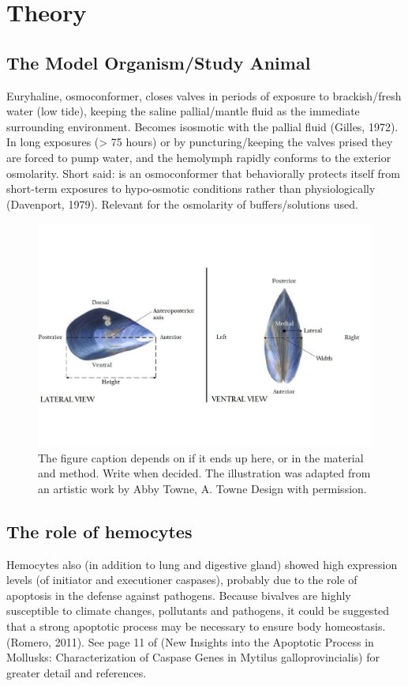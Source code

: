 \chapter{Theory}
\section{The Model Organism/Study Animal}
Euryhaline, osmoconformer, closes valves in periods of exposure to brackish/fresh water (low tide), keeping the saline pallial/mantle fluid as the immediate surrounding environment. Becomes isosmotic with the pallial fluid (Gilles, 1972). In long exposures (> 75 hours) or by puncturing/keeping the valves prised they are forced to pump water, and the hemolymph rapidly conforms to the exterior osmolarity. Short said: is an osmoconformer that behaviorally protects itself from short-term exposures to hypo-osmotic conditions rather than physiologically (Davenport, 1979). Relevant for the osmolarity of buffers/solutions used.

\begin{figure}[H]
    \centering
    \includegraphics[width=\textwidth]{figures/Anatomy/M_edulis_anatomical_axis_lateral.jpg}
    \caption{The figure caption depends on if it ends up here, or in the material and method. Write when decided. The illustration was adapted from an artistic work by Abby Towne, A. Towne Design with permission.}
    \label{fig:anatomical_axis}
\end{figure}

\section{The role of hemocytes}
Hemocytes also (in addition to lung and digestive gland) showed high expression levels (of initiator and executioner caspases), probably due to the role of apoptosis in the defense against pathogens. Because bivalves are highly susceptible to climate changes, pollutants and pathogens, it  could be suggested that a strong apoptotic process may be necessary to ensure body homeostasis. (Romero, 2011). See page 11 of (New Insights into the Apoptotic Process in Mollusks: Characterization of Caspase Genes in Mytilus galloprovincialis) for greater detail and references.